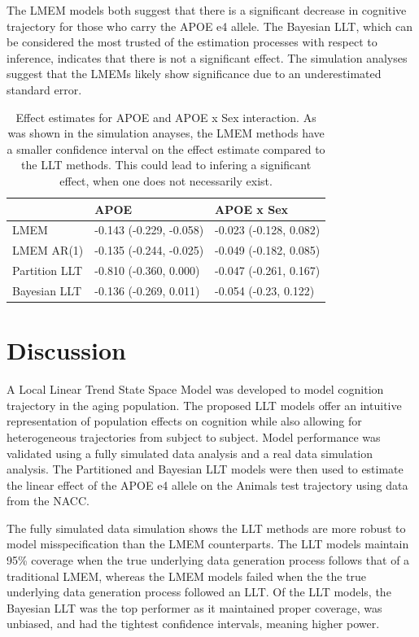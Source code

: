 \documentclass[
]{article}
\begin{document}
The LMEM models both suggest that there is a significant decrease in cognitive trajectory for those who carry the APOE e4 allele. The Bayesian LLT, which can be considered the most trusted of the estimation processes with respect to inference, indicates that there is not a significant effect. The simulation analyses suggest that the LMEMs likely show significance due to an underestimated standard error.

\begin{longtable}[t]{l|l|l}
\caption{\label{tab:effectTab}Effect estimates for APOE and APOE x Sex interaction. As was shown in the simulation anayses, the LMEM methods have a smaller confidence interval on the effect estimate compared to the LLT methods. This could lead to infering a significant effect, when one does not necessarily exist.}\\
\hline
  & APOE & APOE x Sex\\
\hline
LMEM & -0.143 (-0.229, -0.058) & -0.023 (-0.128, 0.082)\\
\hline
LMEM AR(1) & -0.135 (-0.244, -0.025) & -0.049 (-0.182, 0.085)\\
\hline
Partition LLT & -0.810 (-0.360, 0.000) & -0.047 (-0.261, 0.167)\\
\hline
Bayesian LLT & -0.136 (-0.269, 0.011) & -0.054 (-0.23, 0.122)\\
\hline
\end{longtable}

\hypertarget{discussion}{%
\section{Discussion}\label{discussion}}

A Local Linear Trend State Space Model was developed to model cognition trajectory in the aging population. The proposed LLT models offer an intuitive representation of population effects on cognition while also allowing for heterogeneous trajectories from subject to subject. Model performance was validated using a fully simulated data analysis and a real data simulation analysis. The Partitioned and Bayesian LLT models were then used to estimate the linear effect of the APOE e4 allele on the Animals test trajectory using data from the NACC.

The fully simulated data simulation shows the LLT methods are more robust to model misspecification than the LMEM counterparts. The LLT models maintain 95\% coverage when the true underlying data generation process follows that of a traditional LMEM, whereas the LMEM models failed when the the true underlying data generation process followed an LLT. Of the LLT models, the Bayesian LLT was the top performer as it maintained proper coverage, was unbiased, and had the tightest confidence intervals, meaning higher power.
\end{document}

